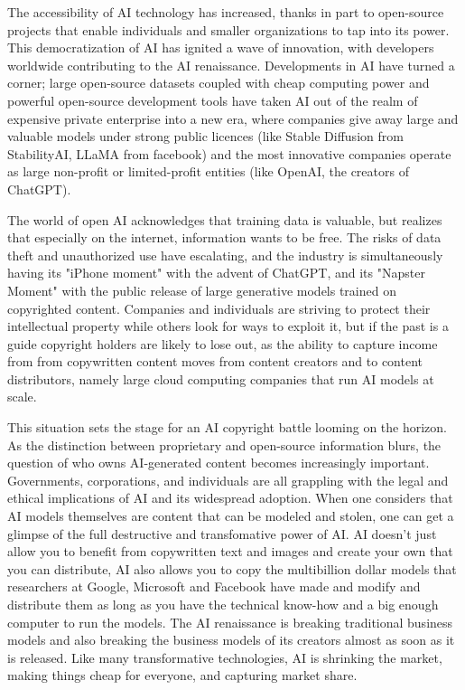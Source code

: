 The accessibility of AI technology has increased, thanks in part to open-source projects that enable individuals and smaller organizations to tap into its power. This democratization of AI has ignited a wave of innovation, with developers worldwide contributing to the AI renaissance. Developments in AI have turned a corner; large open-source datasets coupled with cheap computing power and powerful open-source development tools have taken AI out of the realm of expensive private enterprise into a new era, where companies give away large and valuable models under strong public licences (like Stable Diffusion from StabilityAI, LLaMA from facebook) and the most innovative companies operate as large non-profit or limited-profit entities (like OpenAI, the creators of ChatGPT).   




The world of open AI acknowledges that training data is valuable, but realizes that especially on the internet, information wants to be free.  The risks of data theft and unauthorized use have escalating, and the industry is simultaneously having its "iPhone moment" with the advent of ChatGPT, and its "Napster Moment" with the public release of large generative models trained on copyrighted content. Companies and individuals are striving to protect their intellectual property while others look for ways to exploit it, but if the past is a guide copyright holders are likely to lose out, as the ability to capture income from from copywritten content moves from content creators and to content distributors, namely large cloud computing companies that run AI models at scale.

This situation sets the stage for an AI copyright battle looming on the horizon. As the distinction between proprietary and open-source information blurs, the question of who owns AI-generated content becomes increasingly important. Governments, corporations, and individuals are all grappling with the legal and ethical implications of AI and its widespread adoption. When one considers that AI models themselves are content that can be modeled and stolen, one can get a glimpse of the full destructive and transfomative power of AI. AI doesn't just allow you to benefit from copywritten text and images and create your own that you can distribute, AI also allows you to copy the multibillion dollar models that researchers at Google, Microsoft and Facebook have made and modify and distribute them as long as you have the technical know-how and a big enough computer to run the models. The AI renaissance is breaking traditional business models and also breaking the business models of its creators almost as soon as it is released. Like many transformative technologies, AI is shrinking the market, making things cheap for everyone, and capturing market share.

